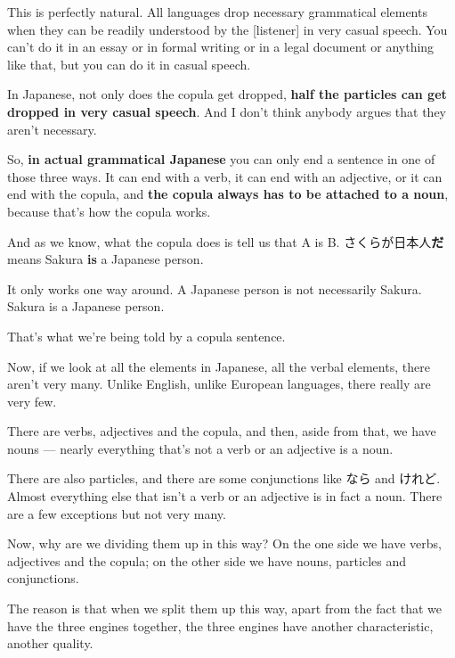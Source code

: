 This is perfectly natural. All languages drop necessary grammatical elements when they can be readily understood by the {[}listener{]} in very casual speech. You can't do it in an essay or in formal writing or in a legal document or anything like that, but you can do it in casual speech.

\thinrule

In Japanese, not only does the copula get dropped, {\bf half the particles can get dropped in very casual speech}. And I don't think anybody argues that they aren't necessary.

So, {\bf in actual grammatical Japanese} you can only end a sentence in one of those three ways. It can end with a verb, it can end with an adjective, or it can end with the copula, and {\bf the copula always has to be attached to a noun}, because that's how the copula works.

And as we know, what the copula does is tell us that A is B. さくらが日本人{\bf だ} means Sakura {\bf is} a Japanese person.

{}

It only works one way around. A Japanese person is not necessarily Sakura. Sakura is a Japanese person.

That's what we're being told by a copula sentence.

\thinrule

Now, if we look at all the elements in Japanese, all the verbal elements, there aren't very many. Unlike English, unlike European languages, there really are very few.

{}

There are verbs, adjectives and the copula, and then, aside from that, we have nouns --- nearly everything that's not a verb or an adjective is a noun.

There are also particles, and there are some conjunctions like なら and けれど. Almost everything else that isn't a verb or an adjective is in fact a noun. There are a few exceptions but not very many.

Now, why are we dividing them up in this way? On the one side we have verbs, adjectives and the copula; on the other side we have nouns, particles and conjunctions.

The reason is that when we split them up this way, apart from the fact that we have the three engines together, the three engines have another characteristic, another quality.

